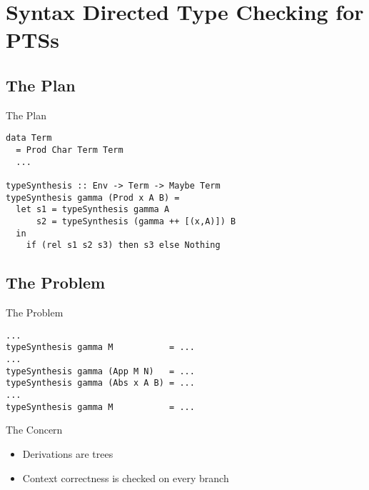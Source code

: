 \documentclass{beamer}
\begin{document}
\section{Syntax Directed Type Checking for PTSs}

\subsection{The Plan}

\begin{frame}[fragile]{The Plan}


  \small{\begin{verbatim}
data Term
  = Prod Char Term Term
  ...

typeSynthesis :: Env -> Term -> Maybe Term
typeSynthesis gamma (Prod x A B) =
  let s1 = typeSynthesis gamma A
      s2 = typeSynthesis (gamma ++ [(x,A)]) B
  in
    if (rel s1 s2 s3) then s3 else Nothing
  \end{verbatim}}


\end{frame}


\subsection{The Problem}

\begin{frame}[fragile]{The Problem}


  \smallskip

  \small{\begin{verbatim}
...
typeSynthesis gamma M           = ...
...
typeSynthesis gamma (App M N)   = ...
typeSynthesis gamma (Abs x A B) = ...
...
typeSynthesis gamma M           = ...
  \end{verbatim}}

\end{frame}


\begin{frame}{The Concern}


  \begin{itemize}
    \item
      Derivations are trees
    \item
      Context correctness is checked on every branch
  \end{itemize}

\end{frame}
\end{document}
